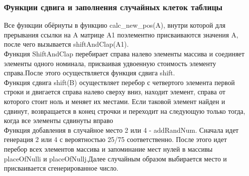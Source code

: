 \documentclass[a4paper,12pt]{article}
\begin{document}
\subsubsection{Функции сдвига и заполнения случайных клеток таблицы}
Все функции обёрнуты в функцию calc\_new\_pos(A), внутри которой для прерывания ссылки на A матрице A1 поэлементно присваиваются значения A, после чего вызывается shiftAndClap(A1).\\
Функция ShiftAndClap перебирает справа налево элементы массива и соединяет элементы одного номинала, присваивая удвоенную стоимость элементу справа.После этого осуществляется функция сдвига shift.\\
Функция сдвига shift(B) осуществляет перебор с четвертого элемента первой строки и двигается справа налево сверху вниз, находит элемент, справа от которого стоит ноль и меняет их местами. Если таковой элемент найден и сдвинут, возвращается в конец строчки и переходит на следующую только тогда, когда все элементы сдвинуты вправо\\
Функция добавления в случайное место 2 или 4 -  addRandNum. Сначала идет генерация 2 или 4 с вероятностью 25/75 соответственно. После этого идет перебор всех элементов массива и запоминание мест нулей в массивы placeOfNulli и placeOfNullj.Далее случайным образом выбирается место и присваивается сгенерированное число.\\
\end{document}
